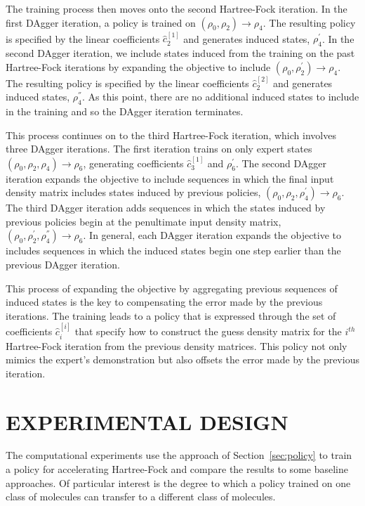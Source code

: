 \documentclass[twoside,11pt]{article}
\begin{document}
The training process then moves onto the second Hartree-Fock iteration. In the first DAgger iteration, a policy is trained on $(\rho_0, \rho_2) \rightarrow \rho_4$. The resulting policy is specified by the linear coefficients $\hat{c}^{[1]}_2$ and generates induced states, $\rho_4^{'}$. In the second DAgger iteration, we include states induced from the training on the past Hartree-Fock iterations by expanding the objective to include $(\rho_0, \rho_2^{'}) \rightarrow \rho_4$. The resulting policy is specified by the linear coefficients $\hat{c}^{[2]}_2$ and generates induced states, $\rho_4^{''}$. As this point, there are no additional induced states to include in the training and so the DAgger iteration terminates. 

This process continues on to the third Hartree-Fock iteration, which involves three DAgger iterations. The first iteration trains on only expert states $(\rho_0, \rho_2, \rho_4) \rightarrow \rho_6$, generating coefficients $\hat{c}^{[1]}_3$ and $\rho_6^{'}$. The second DAgger iteration expands the objective to include sequences in which the final input density matrix includes states induced by previous policies, $(\rho_0, \rho_2, \rho_4^{'}) \rightarrow \rho_6$. The third DAgger iteration adds sequences in which the states induced by previous policies begin at the penultimate input density matrix,  $(\rho_0, \rho_2^{'}, \rho_{4}^{''}) \rightarrow \rho_6$. In general, each DAgger iteration expands the objective to includes sequences in which the induced states begin one step earlier than the previous DAgger iteration.  

This process of expanding the objective by aggregating previous sequences of induced states is the key to compensating the error made by the previous iterations. The training leads to a policy that is expressed through the set of coefficients $\hat{c}^{[i]}_i$ that specify how to construct the guess density matrix for the $i^{th}$ Hartree-Fock iteration from the previous density matrices. This policy not only mimics the expert's demonstration but also offsets the error made by the previous iteration.

\section{EXPERIMENTAL DESIGN}
The computational experiments use the approach of Section~\ref{sec:policy} to train a policy for accelerating Hartree-Fock and compare the results to some baseline approaches. Of particular interest is the degree to which a policy trained on one class of molecules can transfer to a different class of molecules.
\end{document}
